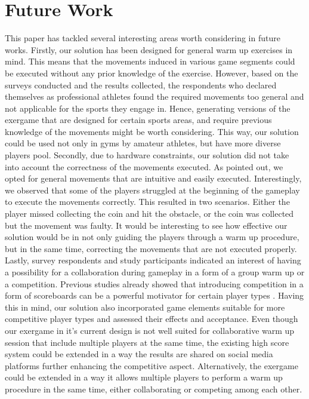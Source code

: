 \section{Future Work}
This paper has tackled several interesting areas worth considering in future works. 
Firstly, our solution has been designed for general warm up exercises in mind. This means that the movements induced in various game segments could be executed without any prior knowledge of the exercise. However, based on the surveys conducted and the results collected, the respondents who declared themselves as professional athletes found the required movements too general and not applicable for the sports they engage in. Hence, generating versions of the exergame that are designed for certain sports areas, and require previous knowledge of the movements might be worth considering. This way, our solution could be used not only in gyms by amateur athletes, but have more diverse players pool. Secondly, due to hardware constraints, our solution did not take into account the correctness of the movements executed. As pointed out, we opted for general movements that are intuitive and easily executed. Interestingly, we observed that some of the players struggled at the beginning of the gameplay to execute the movements correctly. This resulted in two scenarios. Either the player missed collecting the coin and hit the obstacle, or the coin was collected but the movement was faulty. It would be interesting to see how effective our solution would be in not only guiding the players through a warm up procedure, but in the same time, correcting the movements that are not executed properly. Lastly, survey respondents and study participants indicated an interest of having a possibility for a collaboration during gameplay in a form of a group warm up or a competition. Previous studies already showed that introducing competition in a form of scoreboards can be a powerful motivator for certain player types \cite{ werbach2012win, zichermann2011gamification}. Having this in mind, our solution also incorporated game elements suitable for more competitive player types and assessed their effects and acceptance. Even though our exergame in it's current design is not well suited for collaborative warm up session that include multiple players at the same time, the existing high score system could be extended in a way the results are shared on social media platforms further enhancing the competitive aspect. Alternatively, the exergame could be extended in a way it allows multiple players to perform a warm up procedure in the same time, either collaborating or competing among each other. 
